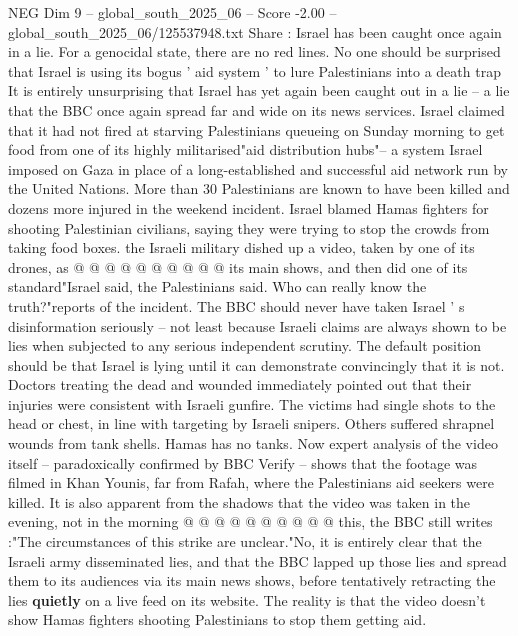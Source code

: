 \begin{textsample}{NEG Dim 9 – global\_south\_2025\_06 – Score -2.00 – global\_south\_2025\_06/125537948.txt}  \label{ex:f9_neg_281}
Share : Israel has been caught once again in a lie.
For a genocidal state, there are no red lines.
No one should be surprised that Israel is using its bogus ' aid system ' to lure Palestinians into a death trap It is entirely unsurprising that Israel has yet again been caught out in a lie -- a lie that the BBC once again spread far and wide on its news services.
Israel claimed that it had not fired at starving Palestinians queueing on Sunday morning to get food from one of its highly militarised"aid distribution hubs"-- a system Israel imposed on Gaza in place of a long-established and successful aid network run by the United Nations.
More than 30 Palestinians are known to have been killed and dozens more injured in the weekend incident.
Israel blamed Hamas fighters for shooting Palestinian civilians, saying they were trying to stop the crowds from taking food boxes. the Israeli military dished up a video, taken by one of its drones, as @ @ @ @ @ @ @ @ @ @ its main shows, and then did one of its standard"Israel said, the Palestinians said.
Who can really know the truth?"reports of the incident.
The BBC should never have taken Israel ' s disinformation seriously -- not least because Israeli claims are always shown to be lies when subjected to any serious independent scrutiny.
The default position should be that Israel is lying until it can demonstrate convincingly that it is not.
Doctors treating the dead and wounded immediately pointed out that their injuries were consistent with Israeli gunfire.
The victims had single shots to the head or chest, in line with targeting by Israeli snipers.
Others suffered shrapnel wounds from tank shells.
Hamas has no tanks.
Now expert analysis of the video itself -- paradoxically confirmed by BBC Verify -- shows that the footage was filmed in Khan Younis, far from Rafah, where the Palestinians aid seekers were killed.
It is also apparent from the shadows that the video was taken in the evening, not in the morning @ @ @ @ @ @ @ @ @ @ this, the BBC still writes :"The circumstances of this strike are unclear."No, it is entirely clear that the Israeli army disseminated lies, and that the BBC lapped up those lies and spread them to its audiences via its main news shows, before tentatively retracting the lies \textbf{quietly} on a live feed on its website.
The reality is that the video doesn't show Hamas fighters shooting Palestinians to stop them getting aid.

\end{textsample}
